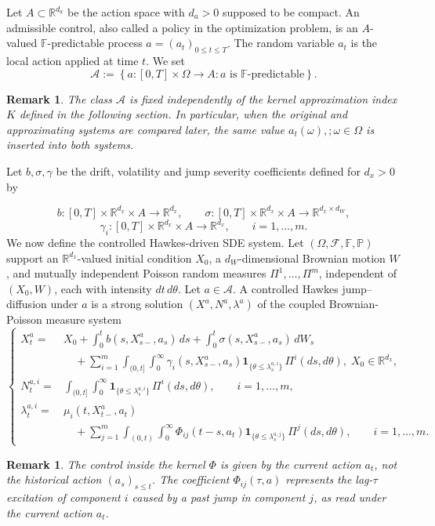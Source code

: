 \documentclass[11pt]{article}
\theoremstyle{remarkitalic}
\theoremstyle{remarkitalic}
\newtheorem{remark}[theorem]{Remark}
\newcommand{\R}{\mathbb R}
\newcommand{\1}{\mathbf 1}
\begin{document}
Let $A\subset\R^{d_a}$ be the action space with $d_a>0$ supposed to be compact. An admissible control, also called a policy in the optimization problem,
is an $A$-valued $\mathbb{F}$-predictable process
$
a=(a_t)_{0\leq t\leq T}.$
The random variable $a_t$ is the local action applied at time $t$. We set
\[
\mathcal{A}
:=
\left\{
 a:[0,T]\times\Omega\longrightarrow A:
 a\text{ is }\mathbb{F}\text{-predictable}
\right\}.
\]
\begin{remark}
    The class $\mathcal{A}$ is fixed independently of the kernel
approximation index $K$ defined in the following section. In particular, when the original and
approximating systems are compared later,
the same value $a_t(\omega),; \omega\in \Omega$ is inserted into both systems.
\end{remark} Let $b,\sigma,\gamma$ be the drift, volatility and jump severity coefficients defined for $d_x>0$ by

\[ b:[0,T]\times\R^{d_x}\times A\to\R^{d_x},
    \qquad
    \sigma:[0,T]\times\R^{d_x}\times A\to\R^{d_x\times d_W},
\]
\[
    \gamma_i:[0,T]\times\R^{d_x}\times A\to\R^{d_x},
    \qquad i=1,\dots,m.
\] We now define the controlled Hawkes-driven SDE system. Let $(\Omega,\mathcal F,\mathbb F,\mathbb P)$ support an
$\mathbb R^{d_x}$-valued initial condition $X_0$, a
$d_W$-dimensional Brownian motion $W$, and mutually independent
Poisson random measures $\Pi^1,\ldots,\Pi^m$, independent of
$(X_0,W)$, each with intensity $dt\,d\theta$. Let $a\in\mathcal{A}$. A controlled Hawkes jump--diffusion under $a$
is a strong solution
$
(X^a,N^a,\lambda^a)$
of the coupled Brownian-Poisson measure system
\begin{equation}
\label{eq:poisson-embedded-hawkes-sde}
\left\{
\begin{aligned}
X_t^a
={}&X_0
+\int_0^t b(s,X_{s-}^a,a_s)\,ds
+\int_0^t \sigma(s,X_{s-}^a,a_s)\,dW_s
\\
&\quad
+\sum_{i=1}^m
\int_{(0,t]}\int_0^\infty
\gamma_i(s,X_{s-}^a,a_s)
\mathbf{1}_{\{\theta\leq\lambda_s^{a,i}\}}
\,\Pi^i(ds,d\theta),\; X_0\in \mathbb R^{d_x},
\\[0.25cm]
N_t^{a,i}
={}&
\int_{(0,t]}\int_0^\infty
\mathbf{1}_{\{\theta\leq\lambda_s^{a,i}\}}
\,\Pi^i(ds,d\theta),
\qquad i=1,\ldots,m,
\\[0.25cm]
\lambda_t^{a,i}
={}&
\mu_i(t,X_{t-}^a,a_t)
\\
&\quad
+\sum_{j=1}^m
\int_{(0,t)}\int_0^\infty
\Phi_{ij}(t-s,a_t)
\mathbf{1}_{\{\theta\leq\lambda_s^{a,j}\}}
\,\Pi^j(ds,d\theta),
\qquad i=1,\ldots,m.
\end{aligned}
\right.
\end{equation}
\begin{remark}
  The control inside the kernel $\Phi$ is given by the current action $a_t$, not the historical action $(a_s)_{s\leq t}$. The coefficient $\Phi_{ij}(\tau,a)$ represents the lag-$\tau$ excitation of component $i$ caused by a past jump in component $j$, as read under the current action $a_t$. 
\end{remark}
\end{document}
